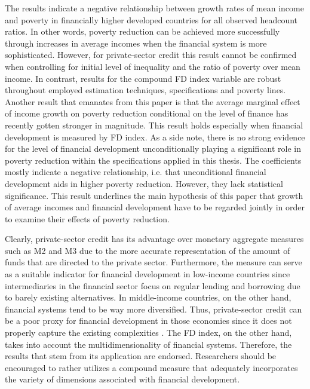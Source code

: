\documentclass[12pt, a4paper]{article}
\begin{document}
The results indicate a negative relationship between growth rates of mean income and poverty in financially higher developed countries for all observed headcount ratios. In other words, poverty reduction can be achieved more successfully through increases in average incomes when the financial system is more sophisticated. However, for private-sector credit this result cannot be confirmed when controlling for initial level of inequality and the ratio of poverty over mean income. In contrast, results for the compound FD index variable are robust throughout employed estimation techniques, specifications and poverty lines. Another result that emanates from this paper is that the average marginal effect of income growth on poverty reduction conditional on the level of finance has recently gotten stronger in magnitude. This result holds especially when financial development is measured by FD index. As a side note, there is no strong evidence for the level of financial development unconditionally playing a significant role in poverty reduction within the specifications applied in this thesis. The coefficients mostly indicate a negative relationship, i.e. that unconditional financial development aids in higher poverty reduction. However, they lack statistical significance. This result underlines the main hypothesis of this paper that growth of average incomes and financial development have to be regarded jointly in order to examine their effects of poverty reduction.

Clearly, private-sector credit has its advantage over monetary aggregate measures such as M2 and M3 due to the more accurate representation of the amount of funds that are directed to the private sector. Furthermore, the measure can serve as a suitable indicator for financial development in low-income countries since intermediaries in the financial sector focus on regular lending and borrowing due to barely existing alternatives. In middle-income countries, on the other hand, financial systems tend to be way more diversified. Thus, private-sector credit can be a poor proxy for financial development in those economies since it does not properly capture the existing complexities \cite{seven2016}. The FD index, on the other hand, takes into account the multidimensionality of financial systems. Therefore, the results that stem from its application are endorsed. Researchers should be encouraged to rather utilizes a compound measure that adequately incorporates the variety of dimensions associated with financial development.
\end{document}
